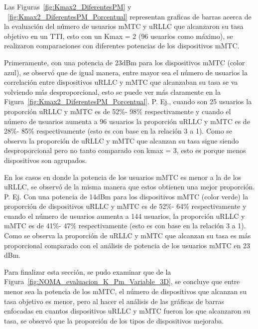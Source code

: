 Las Figuras~\ref{fig:Kmax2_DiferentesPM} y ~\ref{fig:Kmax2_DiferentesPM_Porcentual} representan graficas de barras acerca de la evaluación del número de usuarios mMTC y uRLLC que alcanzaron su tasa objetivo en un TTI, esto con un Kmax = 2 (96 usuarios como máximo), se realizaron comparaciones con diferentes potencias de los dispositivos mMTC.\newline

Primeramente, con una potencia de 23dBm para los dispositivos mMTC (color azul), se observó que de igual manera, entre mayor sea el número de usuarios la correlación entre dispositivos uRLLC y mMTC que alcanzaban su tasa se va volviendo más desproporcional, esto se puede ver más claramente en la Figura~\ref{fig:Kmax2_DiferentesPM_Porcentual}. P. Ej., cuando son 25 usuarios la proporción uRLLC y mMTC es de 52\%- 98\% respectivamente y cuando el número de usuarios aumenta a 96 usuarios la proporción uRLLC y mMTC es de 28\%- 85\% respectivamente (esto es con base en la relación 3 a 1). Como se observa la proporción de uRLLC y mMTC que alcanzan su tasa sigue siendo desproporcional pero no tanto comparado con kmax = 3, esto es porque menos dispositivos son agrupados.\newline

En los casos en donde la potencia de los usuarios mMTC es menor a la de los uRLLC, se observó de la misma manera que estos obtienen una mejor proporción. P. Ej. Con una potencia de 14dBm para los dispositivos mMTC (color verde) la proporción de dispositivos uRLLC y mMTC es de 52\%- 64\% respectivamente y cuando el número de usuarios aumenta a 144 usuarios, la proporción uRLLC y mMTC es de 41\%- 47\% respectivamente (esto es con base en la relación 3 a 1). Como se observa la proporción de uRLLC y mMTC que alcanzan su tasa es más proporcional comparado con el análisis de potencia de los usuarios mMTC en 23 dBm. \newline


Para finalizar esta sección, se pudo examinar que de la Figura~\ref{fig:NOMA_evaluacion_K_Pm_Variable_3D}, se concluye que entre menor sea la potencia de los mMTC, el número de dispositivos que alcanzan su tasa objetivo es menor, pero al hacer el análisis de las gráficas de barras enfocadas en cuantos dispositivos uRLLC y mMTC fueron los que alcanzaron su tasa, se observó que la proporción de los tipos de dispositivos mejoraba.



